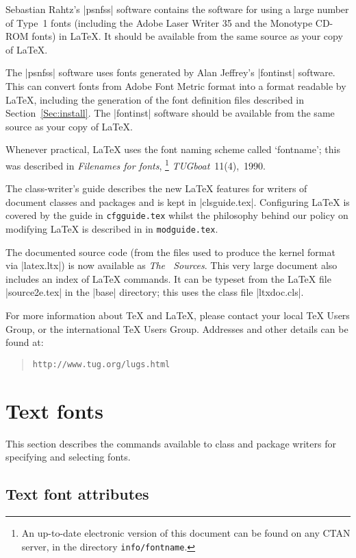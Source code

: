 \documentclass{ltxguide}[1995/11/28]
\begin{document}
Sebastian Rahtz's |psnfss| software contains the software for using a
large number of Type~1 fonts (including the Adobe Laser Writer 35 and
the Monotype CD-ROM fonts) in \LaTeX.  It should be available from the
same source as your copy of \LaTeX.
 
The |psnfss| software uses fonts generated by Alan Jeffrey's
|fontinst| software.  This can convert fonts from Adobe Font Metric
format into a format readable by \LaTeX, including the generation of
the font definition files described in Section~\ref{Sec:install}.  The
|fontinst| software should be available from the same source as your
copy of \LaTeX.
 
Whenever practical, \LaTeX{} uses the font naming scheme called
`fontname'; this was described in \emph{Filenames for fonts},%
\footnote{An up-to-date electronic version
of this document can be found on any CTAN server, in the directory
\texttt{info/fontname}.}
\emph{TUGboat}~11(4),~1990.

The class-writer's guide \emph{\clsguide} describes
the new \LaTeX{} features for writers of document classes and packages
and is kept in |clsguide.tex|. Configuring
\LaTeX{} is covered by the guide \emph{\cfgguide} in
\texttt{cfgguide.tex} whilst the philosophy behind our policy on 
modifying \LaTeX{} is described in \emph{\modguide} in
\texttt{modguide.tex}.
 
The documented source code (from the files used to produce
the kernel format via |latex.ltx|) is now available as
\emph{The \LaTeXe\ Sources}.
This very large document also includes an index of \LaTeX{}
commands.  It can be typeset from the \LaTeX{} file |source2e.tex|
in the |base| directory; this uses the class file |ltxdoc.cls|.

For more information about \TeX{} and \LaTeX{}, please contact your
local \TeX{} Users Group, or the international \TeX{} Users Group.
Addresses and other details can be found at:
\begin{quote}\small\label{addrs}
    \texttt{http://www.tug.org/lugs.html}
\end{quote}


\section{Text fonts}
\label{Sec:text}
 
This section describes the commands available to class and package
writers for specifying and selecting fonts.
 
\subsection{Text font attributes}
 
\end{document}
